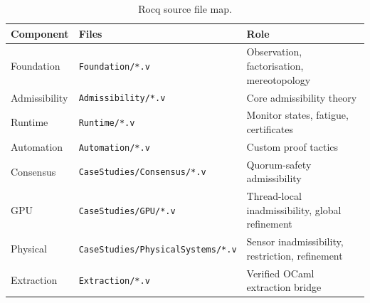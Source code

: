 \documentclass[a4paper,11pt]{article}
\begin{document}
\begin{table}[h]
\centering
\begin{tabular}{lll}
\toprule
Component & Files & Role \\
\midrule
Foundation & \texttt{Foundation/*.v} & Observation, factorisation, mereotopology \\
Admissibility & \texttt{Admissibility/*.v} & Core admissibility theory \\
Runtime & \texttt{Runtime/*.v} & Monitor states, fatigue, certificates \\
Automation & \texttt{Automation/*.v} & Custom proof tactics \\
Consensus & \texttt{CaseStudies/Consensus/*.v} & Quorum-safety admissibility \\
GPU & \texttt{CaseStudies/GPU/*.v} & Thread-local inadmissibility, global refinement \\
Physical & \texttt{CaseStudies/PhysicalSystems/*.v} & Sensor inadmissibility, restriction, refinement \\
Extraction & \texttt{Extraction/*.v} & Verified OCaml extraction bridge \\
\bottomrule
\end{tabular}
\caption{Rocq source file map.}
\label{tab:filemap}
\end{table}
\end{document}
